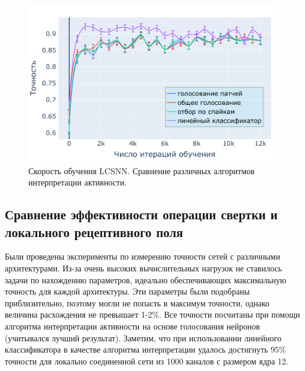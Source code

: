 \documentclass[a4paper]{article}
\begin{document}
\begin{center}
\begin{figure}[H] 
 \includegraphics[width=\textwidth,keepaspectratio=true]{LCSNN_learning_rate_ru.pdf}
 \caption{Скорость обучения LCSNN. Сравнение различных алгоритмов интерпретации активности.}
\end{figure}
\end{center}


\subsection{Сравнение эффективности операции свертки и локального рецептивного поля}
Были проведены эксперименты по измерению точности сетей с различными архитектурами. Из-за очень высоких вычислительных нагрузок не ставилось задачи по нахождению параметров, идеально обеспечивающих максимальную точность для каждой архитектуры. Эти параметры были подобраны приблизительно, поэтому могли не попасть в максимум точности, однако величина расхождения не превышает 1-2\%. Все точности посчитаны при помощи алгоритма интерпретации активности на основе голосования нейронов (учитывался лучший результат). Заметим, что при использовании линейного классификатора в качестве алгоритма интерпретации удалось достигнуть 95\% точности для локально соединенной сети из 1000 каналов с размером ядра 12.
\end{document}

